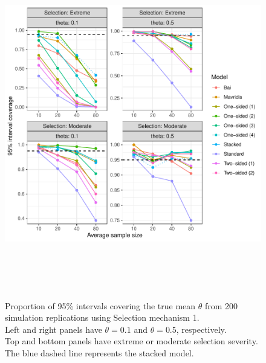 \documentclass[12pt]{article}   	%
\numberwithin{equation}{section}
\begin{document}
\begin{figure}
\includegraphics[height = 6in, width = 6.5in]{sim1_plot_coverage.pdf}
\caption{Proportion of 95\% intervals covering the true mean $\theta$ from 200 simulation replications using Selection mechanism 1. \\
	      Left and right panels have $\theta=0.1$ and $\theta = 0.5$, respectively. \\
	      Top and bottom panels have extreme or moderate selection severity. \\
	      The blue dashed line represents the stacked model.}
\label{fig:sim1_plot_coverage}
\end{figure}
\end{document}
